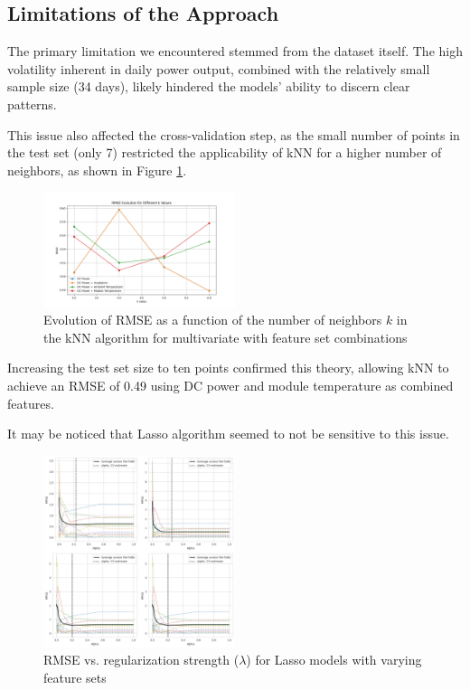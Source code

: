 \subsection{Limitations of the Approach}

The primary limitation we encountered stemmed from the dataset itself. The high volatility inherent in daily power output, combined with the relatively small sample size (34 days), likely hindered the models' ability to discern clear patterns.

This issue also affected the cross-validation step, as the small number of points in the test set (only 7) restricted the applicability of kNN for a higher number of neighbors, as shown in Figure \ref{fig:CV_F_Evo}.

\begin{figure}[h]
    \centering
    \includegraphics[width=0.5\textwidth]{Figures/CV_F_Evo.png}
    \caption{Evolution of RMSE as a function of the number of neighbors $k$ in the kNN algorithm for multivariate with feature set combinations}
    \label{fig:CV_F_Evo}
\end{figure}

Increasing the test set size to ten points confirmed this theory, allowing kNN to achieve an RMSE of 0.49 using DC power and module temperature as combined features.

It may be noticed that Lasso algorithm seemed to not be sensitive to this issue.

\begin{figure}[h]
    \centering
    \includegraphics[width=0.5\textwidth]{Figures/rmse_vs_alpha_lasso.jpg}
    \caption{RMSE vs. regularization strength ($\lambda$) for Lasso models with varying feature sets}
    \label{fig:rmse-vs-alpha}
\end{figure}

